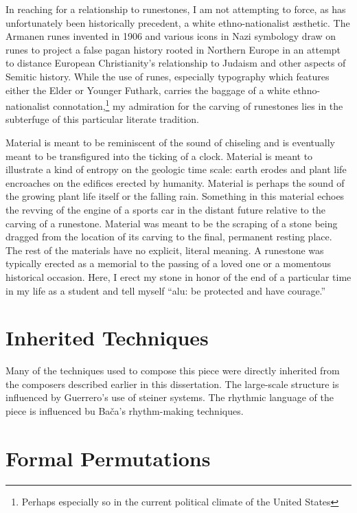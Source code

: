 In reaching for a relationship to runestones, I am not attempting to force, as has unfortunately been historically precedent, a white ethno-nationalist æsthetic. The Armanen runes invented in 1906 and various icons in Nazi symbology draw on runes to project a false pagan history rooted in Northern Europe in an attempt to distance European Christianity's relationship to Judaism and other aspects of Semitic history. While the use of runes, especially typography which features either the Elder or Younger Futhark, carries the baggage of a white ethno-nationalist connotation,\footnote{Perhaps especially so in the current political climate of the United States} my admiration for the carving of runestones lies in the subterfuge of this particular literate tradition.

Material  is meant to be reminiscent of the sound of chiseling and is eventually meant to be transfigured into the ticking of a clock. Material  is meant to illustrate a kind of entropy on the geologic time scale: earth erodes and plant life encroaches on the edifices erected by humanity. Material  is perhaps the sound of the growing plant life itself or the falling rain. Something in this material echoes the revving of the engine of a sports car in the distant future relative to the carving of a runestone. Material  was meant to be the scraping of a stone being dragged from the location of its carving to the final, permanent resting place. The rest of the materials have no explicit, literal meaning. A runestone was typically erected as a memorial to the passing of a loved one or a momentous historical occasion. Here, I erect my stone in honor of the end of a particular time in my life as a student and tell myself ``alu: be protected and have courage.''

\section{Inherited Techniques}

Many of the techniques used to compose this piece were directly inherited from the composers described earlier in this dissertation. The large-scale structure is influenced by Guerrero's use of steiner systems. The rhythmic language of the piece is influenced bu Bača's rhythm-making techniques.

\section{Formal Permutations}


